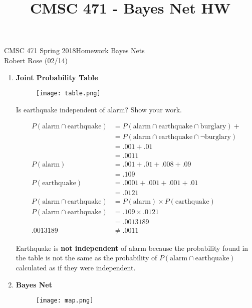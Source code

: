 \documentclass[12pt]{article}
\title{CMSC 471 - Bayes Net HW}
\begin{document}
CMSC 471 Spring 2018\hfill Homework Bayes Nets\\
Robert Rose (02/14)

\hrulefill

\begin{enumerate}
\item \textbf{Joint Probability Table}
\begin{figure}[h!]
  \texttt{[image: table.png]}
  \label{fig:table}
\end{figure}

\vspace{-2em}

Is earthquake independent of alarm? Show your work.\\

\vspace{-3em}

\begin{align*}
        P(\text{alarm} \cap \text{earthquake})
        &= P(\text{alarm} \cap \text{earthquake} \cap \text{burglary}) + \\
        &= P(\text{alarm} \cap \text{earthquake} \cap \neg\text{burglary} )\\
        &= .001 + .01\\
        &= .0011\\
        P(\text{alarm}) &= .001 + .01 + .008 + .09\\
        &= .109\\
        P(\text{earthquake}) &= .0001 + .001 + .001 + .01\\
        &= .0121\\
        P(\text{alarm} \cap \text{earthquake}) &= P(\text{alarm}) \times P(\text{earthquake}) \\
        P(\text{alarm} \cap \text{earthquake}) &= .109 \times .0121\\
        &= .0013189\\
        .0013189 &\neq .0011
    \end{align*}

Earthquake is \textbf{not independent} of alarm because the probability found in the table is not the same as the probability of $P(\text{alarm} \cap \text{earthquake})$ calculated as if they were independent.

\newpage

\item \textbf{Bayes Net}
\begin{figure}[h!]
  \texttt{[image: map.png]}
  \label{fig:map}
\end{figure}


\end{enumerate}
\end{document}
